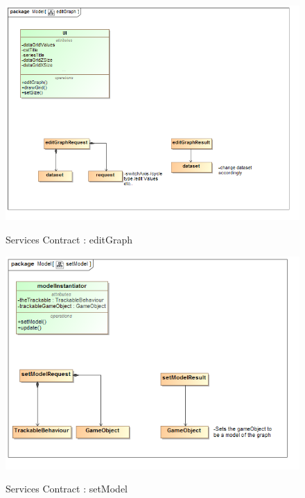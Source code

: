\documentclass[a4paper,12pt]{article}
\begin{document}
	\begin{figure}[H]
		\includegraphics[width=\textwidth]{Images/editGraph.png}  \\
		\caption{Services Contract : editGraph}
	\end{figure}
	
	\begin{figure}[H]
		\includegraphics[width=\textwidth]{Images/setModel.png}  \\
		\caption{Services Contract : setModel}
	\end{figure}
	
\end{document}
